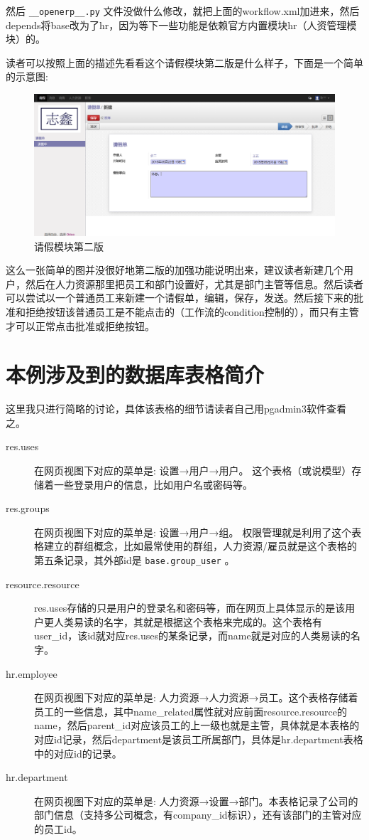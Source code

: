 \documentclass[11pt,a4paper]{sphinxmanual}
\begin{document}
然后 \verb~__openerp__.py~ 文件没做什么修改，就把上面的workflow.xml加进来，然后depends将base改为了hr，因为等下一些功能是依赖官方内置模块hr（人资管理模块）的。

读者可以按照上面的描述先看看这个请假模块第二版是什么样子，下面是一个简单的示意图:

\begin{figure}[H]
\centering
\includegraphics[keepaspectratio,max width=0.95\linewidth]{images/请假模块第二版.png}
\caption{请假模块第二版}
\end{figure}

这么一张简单的图并没很好地第二版的加强功能说明出来，建议读者新建几个用户，然后在人力资源那里把员工和部门设置好，尤其是部门主管等信息。然后读者可以尝试以一个普通员工来新建一个请假单，编辑，保存，发送。然后接下来的批准和拒绝按钮该普通员工是不能点击的（工作流的condition控制的），而只有主管才可以正常点击批准或拒绝按钮。

\section{本例涉及到的数据库表格简介}
\label{sec-10-1}
这里我只进行简略的讨论，具体该表格的细节请读者自己用pgadmin3软件查看之。


\begin{description}
\item[{res.uses}] 在网页视图下对应的菜单是: 设置→用户→用户。 这个表格（或说模型）存储着一些登录用户的信息，比如用户名或密码等。
\item[{res.groups}] 在网页视图下对应的菜单是: 设置→用户→组。 权限管理就是利用了这个表格建立的群组概念，比如最常使用的群组，人力资源/雇员就是这个表格的第五条记录，其外部id是 \verb~base.group_user~ 。
\item[{resource.resource}] res.uses存储的只是用户的登录名和密码等，而在网页上具体显示的是该用户更人类易读的名字，其就是根据这个表格来完成的。这个表格有user\_id，该id就对应res.uses的某条记录，而name就是对应的人类易读的名字。
\item[{hr.employee}] 在网页视图下对应的菜单是: 人力资源→人力资源→员工。这个表格存储着员工的一些信息，其中name\_related属性就对应前面resource.resource的name，然后parent\_id对应该员工的上一级也就是主管，具体就是本表格的对应id记录，然后department是该员工所属部门，具体是hr.department表格中的对应id的记录。
\item[{hr.department}] 在网页视图下对应的菜单是: 人力资源→设置→部门。本表格记录了公司的部门信息（支持多公司概念，有company\_id标识），还有该部门的主管对应的员工id。
\end{description}
\end{document}

